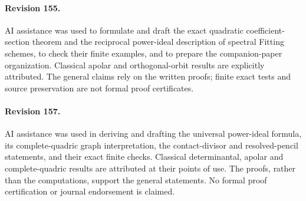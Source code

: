 \documentclass[11pt,reqno]{amsart}
\numberwithin{equation}{section}
\theoremstyle{definition}\newtheorem{definition}[theorem]{Definition}
\theoremstyle{remark}\newtheorem{remark}[theorem]{Remark}
\begin{document}
\paragraph{Revision 155.}
AI assistance was used to formulate and draft the exact quadratic
coefficient-section theorem and the reciprocal power-ideal description
of spectral Fitting schemes, to check their finite examples, and to
prepare the companion-paper organization.  Classical apolar and
orthogonal-orbit results are explicitly attributed.  The general
claims rely on the written proofs; finite exact tests and source
preservation are not formal proof certificates.

\paragraph{Revision 157.}
AI assistance was used in deriving and drafting the universal power-ideal
formula, its complete-quadric graph interpretation, the contact-divisor
and resolved-pencil statements, and their exact finite checks. Classical
determinantal, apolar and complete-quadric results are attributed at their
points of use. The proofs, rather than the computations, support the
general statements. No formal proof certification or journal endorsement
is claimed.
\end{document}

